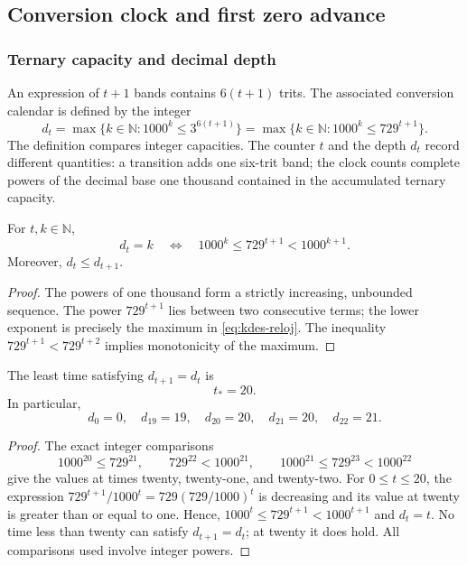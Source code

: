 \subsection{Conversion clock and first zero advance}

\subsubsection{Ternary capacity and decimal depth}

An expression of $t+1$ bands contains $6(t+1)$ trits. The associated conversion calendar is defined by the integer
\begin{equation}
 d_t=\max\{k\in\mathbb N:1000^k\leq3^{6(t+1)}\}
     =\max\{k\in\mathbb N:1000^k\leq729^{t+1}\}.
 \label{eq:kdes-reloj}
\end{equation}
The definition compares integer capacities. The counter $t$ and the
depth $d_t$ record different quantities: a transition adds
one six-trit band; the clock counts complete powers of the
decimal base one thousand contained in the accumulated ternary capacity.

\begin{lemma}
For $t,k\in\mathbb N$,
\[
 d_t=k\quad\Longleftrightarrow\quad
 1000^k\leq729^{t+1}<1000^{k+1}.
\]
Moreover, $d_t\leq d_{t+1}$.
\end{lemma}
\begin{proof}
The powers of one thousand form a strictly increasing, unbounded
sequence. The power $729^{t+1}$ lies between two consecutive terms;
the lower exponent is precisely the maximum in
\eqref{eq:kdes-reloj}. The inequality
$729^{t+1}<729^{t+2}$ implies monotonicity of the maximum.
\end{proof}

\begin{proposition}
The least time satisfying $d_{t+1}=d_t$ is
\[
 t_*=20.
\]
In particular,
\[
 d_0=0,\quad d_{19}=19,\quad d_{20}=20,
 \quad d_{21}=20,\quad d_{22}=21.
\]
\end{proposition}
\begin{proof}
The exact integer comparisons
\[
 1000^{20}\leq729^{21},\qquad
 729^{22}<1000^{21},\qquad
 1000^{21}\leq729^{23}<1000^{22}
\]
give the values at times twenty, twenty-one, and twenty-two. For
$0\leq t\leq20$, the expression
$729^{t+1}/1000^t=729(729/1000)^t$ is decreasing and its value at twenty
is greater than or equal to one. Hence,
$1000^t\leq729^{t+1}<1000^{t+1}$ and $d_t=t$. No time less than
twenty can satisfy $d_{t+1}=d_t$; at twenty it does hold.
All comparisons used involve integer powers.
\end{proof}

